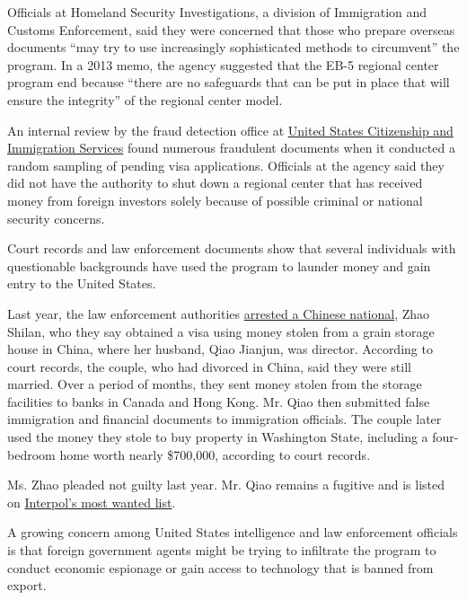 Officials at Homeland Security Investigations, a division of Immigration
and Customs Enforcement, said they were concerned that those who prepare
overseas documents ``may try to use increasingly sophisticated methods
to circumvent'' the program. In a 2013 memo, the agency suggested that
the EB-5 regional center program end because ``there are no safeguards
that can be put in place that will ensure the integrity'' of the
regional center model.

An internal review by the fraud detection office at
\href{http://topics.nytimes.com/top/reference/timestopics/organizations/c/citizenship_and_immigration_services_us/index.html?inline=nyt-org}{United
States Citizenship and Immigration Services} found numerous fraudulent
documents when it conducted a random sampling of pending visa
applications. Officials at the agency said they did not have the
authority to shut down a regional center that has received money from
foreign investors solely because of possible criminal or national
security concerns.

Court records and law enforcement documents show that several
individuals with questionable backgrounds have used the program to
launder money and gain entry to the United States.

Last year, the law enforcement authorities
\href{http://www.nytimes.com/2015/05/16/world/asia/china-hunts-fugitives-accused-of-corruption-many-in-us.html}{arrested
a Chinese national}, Zhao Shilan, who they say obtained a visa using
money stolen from a grain storage house in China, where her husband,
Qiao Jianjun, was director. According to court records, the couple, who
had divorced in China, said they were still married. Over a period of
months, they sent money stolen from the storage facilities to banks in
Canada and Hong Kong. Mr. Qiao then submitted false immigration and
financial documents to immigration officials. The couple later used the
money they stole to buy property in Washington State, including a
four-bedroom home worth nearly \$700,000, according to court records.

Ms. Zhao pleaded not guilty last year. Mr. Qiao remains a fugitive and
is listed on
\href{http://www.interpol.int/notice/search/wanted}{Interpol's most
wanted list}.

A growing concern among United States intelligence and law enforcement
officials is that foreign government agents might be trying to
infiltrate the program to conduct economic espionage or gain access to
technology that is banned from export.

